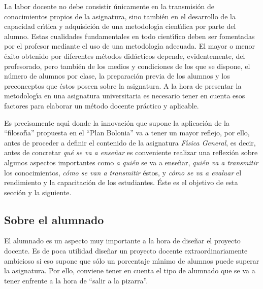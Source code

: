 La labor docente no debe consistir \'{u}nicamente en la transmisi\'{o}n 
de conocimientos propios de la asignatura, sino tambi\'{e}n en el 
desarrollo de la capacidad cr\'{\i}tica y 
 adquisici\'{o}n de una metodolog\'{\i}a cient\'{\i}fica por parte
del alumno.
 Estas cualidades fundamentales en todo cient\'{\i}fico deben ser 
fomentadas por el profesor mediante el uso de una metodolog\'{\i}a adecuada.
El mayor o menor \'{e}xito obtenido por diferentes m\'{e}todos did\'{a}cticos 
depende, evidentemente, del profesorado, pero tambi\'{e}n de los medios 
y condiciones de los que se dispone, el n\'{u}mero de alumnos por clase, 
 la preparaci\'{o}n previa de los alumnos y los preconceptos
que \'{e}stos poseen sobre la asignatura.
A la hora de presentar la metodolog\'{\i}a  en una asignatura 
universitaria es necesario tener en cuenta esos factores 
para elaborar un m\'{e}todo docente pr\'{a}ctico y aplicable. 

Es precisamente aqu\'{\i} donde la innovaci\'{o}n que supone la aplicaci\'{o}n
de la ``filosof\'{\i}a'' propuesta en el ``Plan Bolonia'' va a tener
un mayor reflejo, por ello, antes de proceder a  definir el contenido de la
 asignatura {\it  F\'{\i}sica General}, es decir, antes 
de concretar {\it qu\'{e} se va a ense\~{n}ar} es conveniente realizar una 
reflexi\'{o}n sobre algunos aspectos importantes como  {\it a qui\'{e}n} se va 
a ense\~{n}ar, {\it qui\'{e}n va a transmitir} los conocimientos,
{\it c\'{o}mo se van a transmitir} \'{e}stos, y 
{\it c\'{o}mo se va a evaluar} el rendimiento y la capacitaci\'{o}n de los 
estudiantes. 
\'{E}ste es el objetivo de  esta secci\'{o}n y la siguiente.



\subsection{Sobre el alumnado}
El alumnado es un aspecto muy importante a la hora de
dise\~{n}ar el proyecto docente. Es de poca utilidad dise\~{n}ar un 
proyecto docente extraordinariamente ambicioso si eso supone
que s\'{o}lo un porcentaje m\'\i nimo de  alumnos puede superar la
asignatura. Por ello, conviene tener en cuenta el tipo de alumnado
que se va a tener enfrente a la hora de ``salir a la pizarra''.

